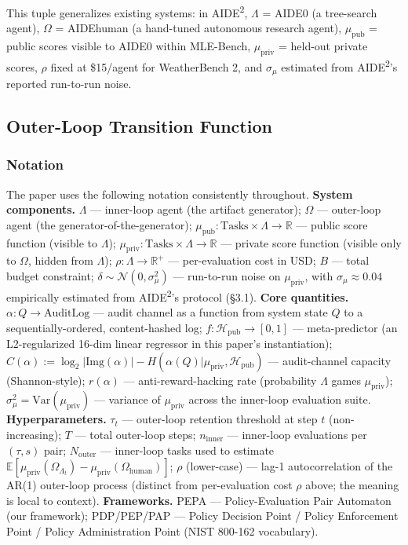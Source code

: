 \documentclass{article}
\theoremstyle{definition}
\begin{document}
This tuple generalizes existing systems: in AIDE\textsuperscript{2}, $\Lambda$ = AIDE0 (a tree-search agent), $\Omega$ = AIDEhuman (a hand-tuned autonomous research agent), $\mu_{\text{pub}}$ = public scores visible to AIDE0 within MLE-Bench, $\mu_{\text{priv}}$ = held-out private scores, $\rho$ fixed at \$15/agent for WeatherBench 2, and $\sigma_\mu$ estimated from AIDE\textsuperscript{2}'s reported run-to-run noise.

\subsection{Outer-Loop Transition Function}

\subsubsection*{Notation}

The paper uses the following notation consistently throughout. \textbf{System components.} $\Lambda$ --- inner-loop agent (the artifact generator); $\Omega$ --- outer-loop agent (the generator-of-the-generator); $\mu_{\text{pub}} : \text{Tasks} \times \Lambda \to \mathbb{R}$ --- public score function (visible to $\Lambda$); $\mu_{\text{priv}} : \text{Tasks} \times \Lambda \to \mathbb{R}$ --- private score function (visible only to $\Omega$, hidden from $\Lambda$); $\rho : \Lambda \to \mathbb{R}^+$ --- per-evaluation cost in USD; $B$ --- total budget constraint; $\delta \sim \mathcal{N}(0, \sigma^2_\mu)$ --- run-to-run noise on $\mu_{\text{priv}}$, with $\sigma_\mu \approx 0.04$ empirically estimated from AIDE\textsuperscript{2}'s protocol (\S3.1). \textbf{Core quantities.} $\alpha : Q \to \text{AuditLog}$ --- audit channel as a function from system state $Q$ to a sequentially-ordered, content-hashed log; $f : \mathcal{H}_{\text{pub}} \to [0,1]$ --- meta-predictor (an L2-regularized 16-dim linear regressor in this paper's instantiation); $C(\alpha) := \log_2 |\text{Img}(\alpha)| - H(\alpha(Q) | \mu_{\text{priv}}, \mathcal{H}_{\text{pub}})$ --- audit-channel capacity (Shannon-style); $r(\alpha)$ --- anti-reward-hacking rate (probability $\Lambda$ games $\mu_{\text{priv}}$); $\sigma^2_\mu = \mathrm{Var}(\mu_{\text{priv}})$ --- variance of $\mu_{\text{priv}}$ across the inner-loop evaluation suite. \textbf{Hyperparameters.} $\tau_t$ --- outer-loop retention threshold at step $t$ (non-increasing); $T$ --- total outer-loop steps; $n_{\text{inner}}$ --- inner-loop evaluations per $(\tau, s)$ pair; $N_{\text{outer}}$ --- inner-loop tasks used to estimate $\mathbb{E}[\mu_{\text{priv}}(\Omega_{\Lambda_t}) - \mu_{\text{priv}}(\Omega_{\text{human}})]$; $\rho$ (lower-case) --- lag-1 autocorrelation of the AR(1) outer-loop process (distinct from per-evaluation cost $\rho$ above; the meaning is local to context). \textbf{Frameworks.} PEPA --- Policy-Evaluation Pair Automaton (our framework); PDP/PEP/PAP --- Policy Decision Point / Policy Enforcement Point / Policy Administration Point (NIST 800-162 vocabulary).
\end{document}
